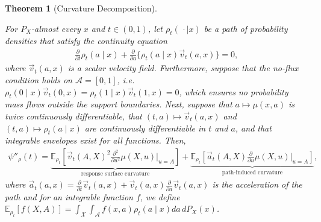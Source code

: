 \documentclass[11pt,twoside]{article}
\newtheorem{theorem}{Theorem}
\theoremstyle{definition}
\theoremstyle{remark}
\begin{document}
\begin{theorem}[Curvature Decomposition] \label{curvature_decomposition}

For $P_X$-almost every $x$ and $t \in (0, 1)$, let $\rho_t(\, \cdot\mid x)$ be a path of probability densities that satisfy the continuity equation
\begin{align*}
    \frac{\partial}{\partial t} \rho_t(a \! \mid \! x) + \frac{\partial}{\partial a} \big\{ \rho_t(a \! \mid \! x) \vec{v}_t(a, x) \big\} = 0,
\end{align*}
where $\vec{v}_t(a, x)$ is a scalar velocity field. Furthermore, suppose that the no-flux condition holds on $\mathcal{A} = [0, 1]$, i.e.\ $ \rho_t(0 \! \mid \! x) \vec{v}_t(0, x) = \rho_t(1 \! \mid \! x) \vec{v}_t(1, x) = 0$, which ensures no probability mass flows outside the support boundaries. Next, suppose that $a \mapsto \mu(x, a)$ is twice continuously differentiable, that $(t, a) \mapsto \vec{v}_t(a, x)$ and $(t, a) \mapsto \rho_t(a \! \mid \! x)$ are continuously differentiable in $t$ and $a$, and that integrable envelopes exist for all functions. Then,
\begin{align*}
    \psi''_\rho(t) = \underbrace{\mathbb{E}_{\rho_t} \! \left[ \vec{v}_t(A, X)^2 \frac{\partial^2 }{\partial u^2} \mu(X, u) \Big|_{u = A} \right]}_{\text{response surface curvature}}+ \underbrace{\mathbb{E}_{\rho_t} \!\left[ \vec{a}_t(A, X) \frac{\partial }{\partial u} \mu(X, u) \Big|_{u = A} \right]}_{\text{path-induced curvature}},
\end{align*}
where $\vec{a}_t(a, x) = \frac{\partial}{\partial t} \vec{v}_t(a, x) + \vec{v}_t(a, x) \frac{\partial}{\partial a} \vec{v}_t(a, x)$ is the acceleration of the path and for an integrable function $f$, we define $\mathbb{E}_{\rho_t}[f(X, A)] = \int_{\mathcal{X}}\int_{\mathcal{A}} f(x, a)\rho_t(a\mid x) da\,dP_X(x)$.
\end{theorem}
\end{document}
